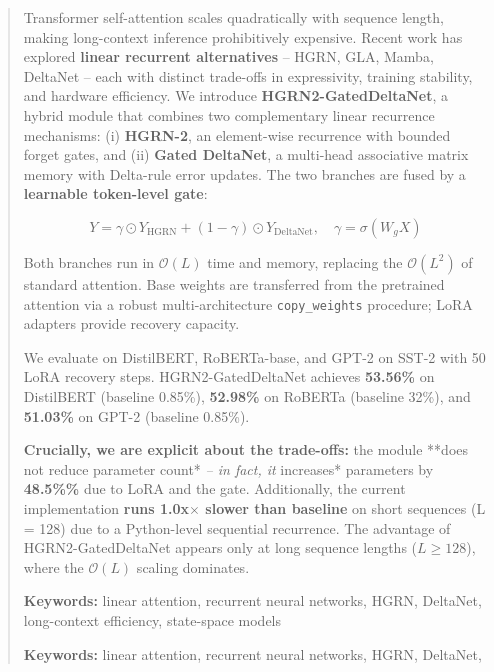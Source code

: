 \documentclass{article}
\begin{document}
\maketitle

\begin{abstract}
Transformer self-attention scales quadratically with sequence length, making 
long-context inference prohibitively expensive. Recent work has explored 
\textbf{linear recurrent alternatives} -- HGRN, GLA, Mamba, DeltaNet -- each with 
distinct trade-offs in expressivity, training stability, and hardware 
efficiency. We introduce \textbf{HGRN2-GatedDeltaNet}, a hybrid module that 
combines two complementary linear recurrence mechanisms: (i) \textbf{HGRN-2}, an 
element-wise recurrence with bounded forget gates, and (ii) \textbf{Gated DeltaNet}, 
a multi-head associative matrix memory with Delta-rule error updates. The 
two branches are fused by a \textbf{learnable token-level gate}:

\[
Y = \gamma \odot Y_\text{HGRN} + (1 - \gamma) \odot Y_\text{DeltaNet}, \quad
\gamma = \sigma(W_g X)
\]

Both branches run in $\mathcal{O}(L)$ time and memory, replacing the 
$\mathcal{O}(L^2)$ of standard attention. Base weights are transferred from 
the pretrained attention via a robust multi-architecture \texttt{copy\_weights} 
procedure; LoRA adapters provide recovery capacity.

We evaluate on DistilBERT, RoBERTa-base, and GPT-2 on SST-2 with 
50 LoRA recovery steps. HGRN2-GatedDeltaNet achieves 
\textbf{53.56\%} on DistilBERT (baseline 0.85\%), \textbf{52.98\%} on 
RoBERTa (baseline 32\%), and \textbf{51.03\%} on GPT-2 (baseline 
0.85\%).

\textbf{Crucially, we are explicit about the trade-offs:} the module **does not 
reduce parameter count*\textit{ -- in fact, it }increases* parameters by 
\textbf{48.5\%\%} due to LoRA and the gate. Additionally, the current 
implementation \textbf{runs 1.0x$\times$ slower than baseline} on short 
sequences (L = 128) due to a Python-level sequential recurrence. The 
advantage of HGRN2-GatedDeltaNet appears only at long sequence lengths 
($L \geq 128$), where the $\mathcal{O}(L)$ scaling dominates.

\textbf{Keywords:} linear attention, recurrent neural networks, HGRN, DeltaNet, 
long-context efficiency, state-space models



\vspace{0.5em}
\noindent\textbf{Keywords:} linear attention, recurrent neural networks, HGRN, DeltaNet,
\end{abstract}
\end{document}
